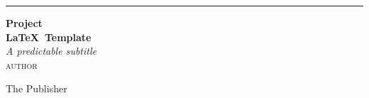 \begin{titlepage} %
	
	\raggedleft %
	
	\rule{1pt}{\textheight} %
	\hspace{0.05\textwidth} %
	\parbox[b]{0.75\textwidth}{ %
		
		{\Huge\bfseries Project \\[0.5\baselineskip] \LaTeX ~Template}\\[2\baselineskip] %
		{\large\textit{A predictable subtitle}}\\[4\baselineskip] %
		{\Large\textsc{author}} %
		
		\vspace{0.5\textheight} %
		
		{\noindent The Publisher~~}\\[\baselineskip] %
	}

\end{titlepage}
